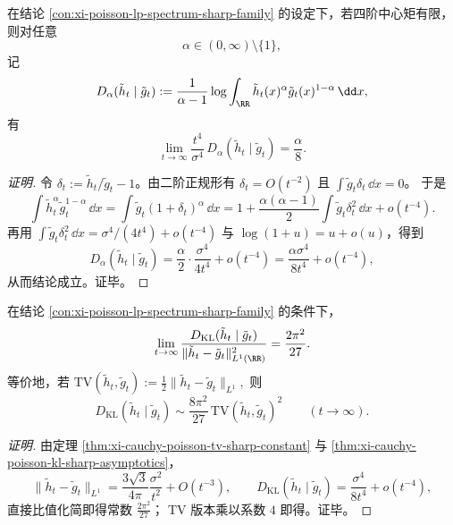 \begin{conclusion}\label{con:xi-poisson-renyi-alpha-over-8}
在结论 \ref{con:xi-poisson-lp-spectrum-sharp-family} 的设定下，若四阶中心矩有限，则对任意
\[
\alpha\in(0,\infty)\setminus\{1\},
\]
记
\[
D_\alpha(\tilde h_t\mid \tilde g_t)
:=\frac{1}{\alpha-1}\log\int_{\RR}\tilde h_t(x)^\alpha \tilde g_t(x)^{1-\alpha}\,\dd x,
\]
有
\[
\lim_{t\to\infty}\frac{t^4}{\sigma^4}\,D_\alpha(\tilde h_t\mid \tilde g_t)=\frac{\alpha}{8}.
\]
\end{conclusion}
\begin{proof}[证明]
令 \(\delta_t:=\tilde h_t/\tilde g_t-1\)。由二阶正规形有 \(\delta_t=O(t^{-2})\) 且
\(\int \tilde g_t\delta_t\,\dd x=0\)。
于是
\[
\int \tilde h_t^\alpha \tilde g_t^{1-\alpha}\,\dd x
=\int \tilde g_t(1+\delta_t)^\alpha\,\dd x
=1+\frac{\alpha(\alpha-1)}{2}\int \tilde g_t\delta_t^2\,\dd x+o(t^{-4}).
\]
再用
\(
\int \tilde g_t\delta_t^2\,\dd x=\sigma^4/(4t^4)+o(t^{-4})
\)
与 \(\log(1+u)=u+o(u)\)，得到
\[
D_\alpha(\tilde h_t\mid \tilde g_t)
=\frac{\alpha}{2}\cdot\frac{\sigma^4}{4t^4}+o(t^{-4})
=\frac{\alpha\sigma^4}{8t^4}+o(t^{-4}),
\]
从而结论成立。证毕。
\end{proof}

\begin{conclusion}\label{con:xi-poisson-kl-l1-square-equivalence-2pi2-27}
在结论 \ref{con:xi-poisson-lp-spectrum-sharp-family} 的条件下，
\[
\lim_{t\to\infty}
\frac{D_{\mathrm{KL}}(\tilde h_t\mid \tilde g_t)}
{\|\tilde h_t-\tilde g_t\|_{L^1(\RR)}^2}
=\frac{2\pi^2}{27}.
\]
等价地，若
\(
\mathrm{TV}(\tilde h_t,\tilde g_t):=\frac12\|\tilde h_t-\tilde g_t\|_{L^1},
\)
则
\[
D_{\mathrm{KL}}(\tilde h_t\mid \tilde g_t)
\sim \frac{8\pi^2}{27}\,\mathrm{TV}(\tilde h_t,\tilde g_t)^2
\qquad(t\to\infty).
\]
\end{conclusion}
\begin{proof}[证明]
由定理 \ref{thm:xi-cauchy-poisson-tv-sharp-constant} 与
\ref{thm:xi-cauchy-poisson-kl-sharp-asymptotics}，
\[
\|\tilde h_t-\tilde g_t\|_{L^1}
=\frac{3\sqrt3}{4\pi}\frac{\sigma^2}{t^2}+O(t^{-3}),
\qquad
D_{\mathrm{KL}}(\tilde h_t\mid \tilde g_t)=\frac{\sigma^4}{8t^4}+o(t^{-4}),
\]
直接比值化简即得常数 \(\frac{2\pi^2}{27}\)；
TV 版本乘以系数 \(4\) 即得。证毕。
\end{proof}

